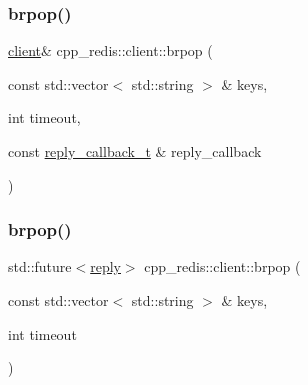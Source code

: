 \mbox{\label{classcpp__redis_1_1client_adc565332168e31ebbd762f2cb12ad4d1}} 
\subsubsection{\texorpdfstring{brpop()}{brpop()}\hspace{0.1cm}{\footnotesize\ttfamily [1/2]}}
{\footnotesize\ttfamily \hyperlink{classcpp__redis_1_1client}{client}\& cpp\+\_\+redis\+::client\+::brpop (\begin{DoxyParamCaption}\item[{const std\+::vector$<$ std\+::string $>$ \&}]{keys,  }\item[{int}]{timeout,  }\item[{const \hyperlink{classcpp__redis_1_1client_a061a1140d36d2eaeda82b09a0bb3f9f2}{reply\+\_\+callback\+\_\+t} \&}]{reply\+\_\+callback }\end{DoxyParamCaption})}

\mbox{\label{classcpp__redis_1_1client_aa123b931c6d00027d08f0fcbde2f026e}} 
\subsubsection{\texorpdfstring{brpop()}{brpop()}\hspace{0.1cm}{\footnotesize\ttfamily [2/2]}}
{\footnotesize\ttfamily std\+::future$<$\hyperlink{classcpp__redis_1_1reply}{reply}$>$ cpp\+\_\+redis\+::client\+::brpop (\begin{DoxyParamCaption}\item[{const std\+::vector$<$ std\+::string $>$ \&}]{keys,  }\item[{int}]{timeout }\end{DoxyParamCaption})}

\mbox{\label{classcpp__redis_1_1client_afa7fb97bb0b30c2c78a605f48b6144e2}} 
